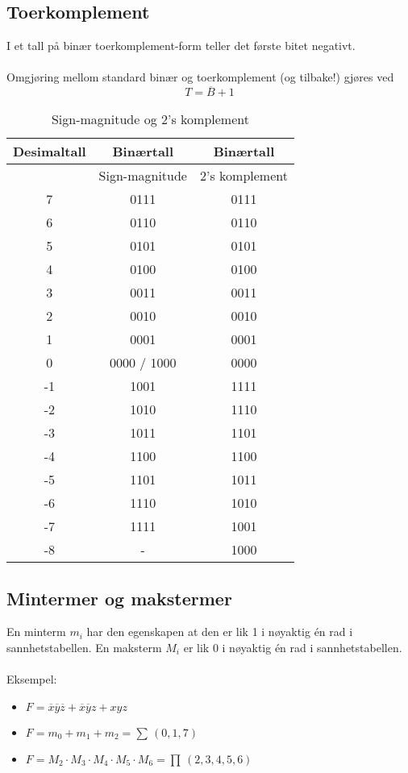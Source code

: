 \documentclass{article}
\begin{document}
\subsection{Toerkomplement}
I et tall på binær toerkomplement-form teller det første bitet negativt.\\\\
Omgjøring mellom standard binær og toerkomplement (og tilbake!) gjøres ved
\[T = \overline{B} + 1\]
\begin{table}[h]
    \centering
    \begin{tabular}{c|c|c}
    Desimaltall & Binærtall & Binærtall \\
    \hline
     & Sign-magnitude & 2's komplement \\
    \hline
    7   & 0111          & 0111\\
    6   & 0110          & 0110\\
    5   & 0101          & 0101\\
    4   & 0100          & 0100\\
    3   & 0011          & 0011\\
    2   & 0010          & 0010\\
    1   & 0001          & 0001\\
    0   & 0000 / 1000   & 0000\\
    -1  & 1001          & 1111\\
    -2  & 1010          & 1110\\
    -3  & 1011          & 1101\\
    -4  & 1100          & 1100\\
    -5  & 1101          & 1011\\
    -6  & 1110          & 1010\\
    -7  & 1111          & 1001\\
    -8  & -             & 1000
    \end{tabular}
    \caption{Sign-magnitude og 2's komplement}
\end{table}


\subsection{Mintermer og makstermer}
En minterm $m_i$ har den egenskapen at den er lik 1 i nøyaktig én rad i sannhetstabellen. En maksterm $M_i$ er lik 0 i nøyaktig én rad i sannhetstabellen.\\\\
Eksempel:
\begin{itemize}
    \item $F = \overline{x}\overline{y}\overline{z} + \overline{x}\overline{y}z + xyz$
    \item $F = m_0 + m_1 + m_2 = \sum \, (0, 1, 7)$
    \item $F = M_2 \cdot M_3 \cdot M_4 \cdot M_5 \cdot M_6 = \prod \, (2, 3, 4, 5, 6)$
\end{itemize}
\end{document}
